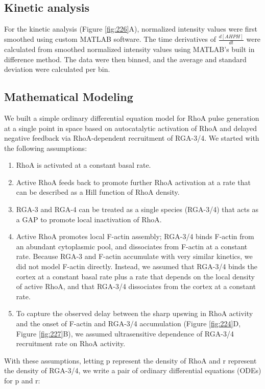 \subsection{Kinetic analysis}
For the kinetic analysis (Figure \ref{fig:226}A), normalized intensity values were first smoothed using custom MATLAB software. The time derivatives of $\frac{d[AHPH]}{dt}$ were calculated from smoothed normalized intensity values using MATLAB’s built in difference method.  The data were then binned, and the average and standard deviation were calculated per bin.

\subsection{Mathematical Modeling}
We built a simple ordinary differential equation model for RhoA pulse generation at a single point in space based on autocatalytic activation of RhoA and delayed negative feedback via RhoA-dependent recruitment of RGA-3/4.  We started with the following assumptions:


\begin{enumerate}  
\item RhoA is activated at a constant basal rate.
\item Active RhoA feeds back to promote further RhoA activation at a rate that can be described as a Hill function of RhoA density. 
\item RGA-3 and RGA-4 can be treated as a single species (RGA-3/4) that acts as a GAP to promote local inactivation of RhoA. 
\item Active RhoA promotes local F-actin assembly; RGA-3/4 binds F-actin from an abundant cytoplasmic pool, and dissociates from F-actin at a constant rate. Because RGA-3 and F-actin accumulate with very similar kinetics,  we did not model F-actin directly.  Instead, we assumed that RGA-3/4 binds the cortex at a constant basal rate plus a rate that depends on the local density of active RhoA, and that RGA-3/4 dissociates from the cortex at a constant rate. 
\item To capture the observed delay between the sharp upswing in RhoA activity and the onset of F-actin and RGA-3/4 accumulation (Figure \ref{fig:224}D, Figure \ref{fig:227}B), we assumed ultrasensitive dependence of RGA-3/4 recruitment rate on RhoA activity.
\end{enumerate}


With these assumptions, letting p represent the density of RhoA and r represent the density of RGA-3/4,  we write a pair of ordinary differential equations (ODEs) for p and r:

